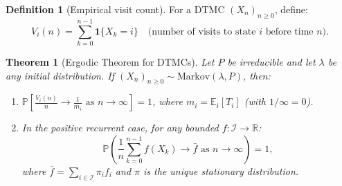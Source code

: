 \documentclass[12pt, a4paper]{article}
\theoremstyle{definition}
\newtheorem{definition}{Definition}[section]
\theoremstyle{plain}
\newtheorem{theorem}{Theorem}[section]
\newcommand{\PP}{\mathbb{P}}
\newcommand{\EE}{\mathbb{E}}
\begin{document}
\begin{definition}[Empirical visit count]
For a DTMC $(X_n)_{n\ge 0}$, define:
\[
  V_i(n) = \sum_{k=0}^{n-1}\mathbf{1}\{X_k=i\} \quad\text{(number of visits to state }i\text{ before time }n).
\]
\end{definition}

\begin{theorem}[Ergodic Theorem for DTMCs]
Let $P$ be irreducible and let $\lambda$ be any initial distribution. If $(X_n)_{n\ge 0}\sim\text{Markov}(\lambda,P)$, then:
\begin{enumerate}[label=(\alph*)]
  \item $\displaystyle\PP\!\left[\frac{V_i(n)}{n}\to\frac{1}{m_i}\text{ as }n\to\infty\right]=1$, where $m_i=\EE_i[T_i]$ (with $1/\infty=0$).
  \item In the positive recurrent case, for any bounded $f:\mathcal{I}\to\mathbb{R}$:
  \[
    \PP\!\left(\frac{1}{n}\sum_{k=0}^{n-1}f(X_k)\to\bar{f}\text{ as }n\to\infty\right)=1,
  \]
  where $\bar{f}=\sum_{i\in\mathcal{I}}\pi_i f_i$ and $\pi$ is the unique stationary distribution.
\end{enumerate}
\end{theorem}
\end{document}
